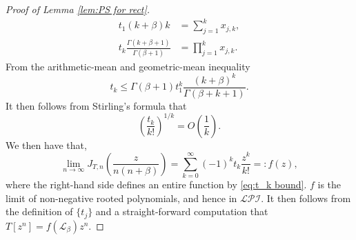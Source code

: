 \documentclass[reqno]{amsart}
\newcommand{\1}{\mathbf{1}}
\theoremstyle{plain}
\theoremstyle{definition}
\theoremstyle{remark}
\numberwithin{equation}{section}
\begin{document}
\begin{proof}[Proof of Lemma \ref{lem:PS for rect}]
\begin{equation}
\begin{aligned}
		t_{1}(k+\beta)k&=\sum_{j=1}^kx_{j,k},\\
		t_{k}\frac{\Gamma(k+\beta+1)}{\Gamma(\beta+1)}&=\prod_{j=1}^kx_{j,k}.
\end{aligned}
	\end{equation} From the arithmetic-mean and geometric-mean inequality \begin{equation}
	t_{k}\leq \Gamma(\beta+1)t_{1}^k\frac{ (k+\beta )^k}{\Gamma(\beta+k+1)}.
	\end{equation} It then follows from Stirling's formula that \begin{equation}\label{eq:t_k bound}
	\left(\frac{t_k}{k!}\right)^{1/k}=O\left(\frac{1}{k}\right).
	\end{equation}	We then have that, \begin{equation}
	\lim\limits_{n\rightarrow\infty}J_{T,n}\left(\frac{z}{n(n+\beta)}\right)=\sum_{k=0}^{\infty}(-1)^{k}t_{k}\frac{z^k}{k!}=:f(z),
	\end{equation}  where the right-hand side defines an entire function by \eqref{eq:t_k bound}. $f$ is the limit of non-negative rooted polynomials, and hence in $\mathcal{LPI}$. It then follows from the definition of $\{t_j\}$ and a straight-forward computation that $T[z^n]=f(\mathscr{L}_{\beta})z^n$.
\end{proof}
\end{document}
